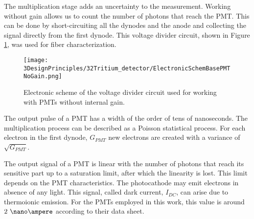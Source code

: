 \begin{enumerate}
The multiplication stage adds an uncertainty to the measurement. Working without gain allows us to count the number of photons that reach the PMT. This can be done by short-circuiting all the dynodes and the anode and collecting the signal directly from the first dynode. This voltage divider circuit, shown in Figure \ref{fig:ElectronicSchemeBasePMTNoGain}, was used for fiber characterization.

\begin{figure}[htbp]
\centering
\texttt{[image: 3DesignPrinciples/32Tritium\_detector/ElectronicSchemBasePMTNoGain.png]}
\caption{Electronic scheme of the voltage divider circuit used for working with PMTs without internal gain.\label{fig:ElectronicSchemeBasePMTNoGain}}
\end{figure}


\end{enumerate}

The output pulse of a PMT has a width of the order of tens of nanoseconds. The multiplication process can be described as a Poisson statistical process. For each electron in the first dynode, $G_{PMT}$ new electrons are created with a variance of $\sqrt{G_{PMT}}$.

The output signal of a PMT is linear with the number of photons that reach its sensitive part up to a saturation limit, after which the linearity is lost. This limit depends on the PMT characteristics. The photocathode may emit electrons in absence of any light. This signal, called dark current, $I_{DC}$, can  arise due to thermoionic emission. For the PMTs employed in this work, this value is around $2~\nano\ampere$ according to their data sheet.

